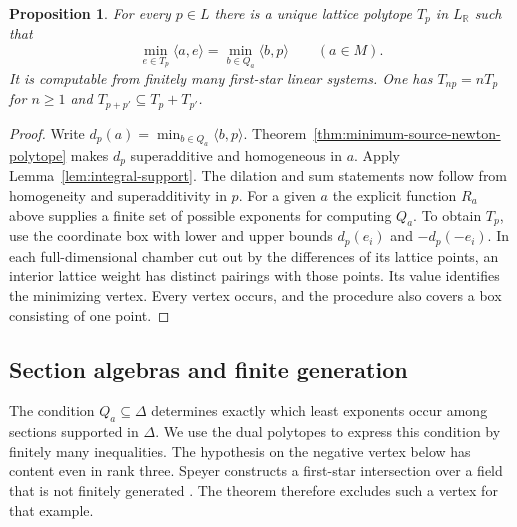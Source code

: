 \documentclass[11pt,reqno]{amsart}
\numberwithin{equation}{section}
\newtheorem{proposition}[theorem]{Proposition}
\theoremstyle{definition}
\theoremstyle{remark}
\begin{document}
\begin{proposition}\label{prop:source-polar-polytope}
For every \(p\in L\) there is a unique lattice polytope \(T_p\)
in \(L_{\mathbb R}\) such that
\begin{equation}\label{eq:dual-polytope-minima}
\min_{e\in T_p}\langle a,e\rangle=\min_{b\in Q_a}\langle b,p\rangle \qquad(a\in M).
\end{equation}
It is computable from finitely many first-star linear systems.
One has \(T_{np}=nT_p\) for \(n\ge1\) and
\(T_{p+p'}\subseteq T_p+T_{p'}\).
\end{proposition}
\begin{proof}
Write \(d_p(a)=\min_{b\in Q_a}\langle b,p\rangle\).
Theorem~\ref{thm:minimum-source-newton-polytope} makes \(d_p\)
superadditive and homogeneous in \(a\). Apply
Lemma~\ref{lem:integral-support}. The dilation and sum statements
now follow from homogeneity and superadditivity in \(p\).
For a given \(a\) the explicit function \(R_a\) above supplies a
finite set of possible exponents for computing \(Q_a\). To obtain \(T_p\),
use the coordinate box with lower and upper bounds \(d_p(e_i)\)
and \(-d_p(-e_i)\). In each full-dimensional chamber cut out by
the differences of its lattice points, an interior lattice weight
has distinct pairings with those points. Its value identifies the
minimizing vertex. Every vertex occurs, and the procedure also
covers a box consisting of one point.
\end{proof}

\subsection{Section algebras and finite generation}

The condition \(Q_a\subseteq\Delta\) determines exactly which least
exponents occur among sections supported in \(\Delta\). We use the
dual polytopes to express this condition by finitely many inequalities.
The hypothesis on the negative vertex below has content even in rank
three. Speyer constructs a first-star intersection over a field that
is not finitely generated \cite{Speyer}. The theorem therefore
excludes such a vertex for that example.
\end{document}
